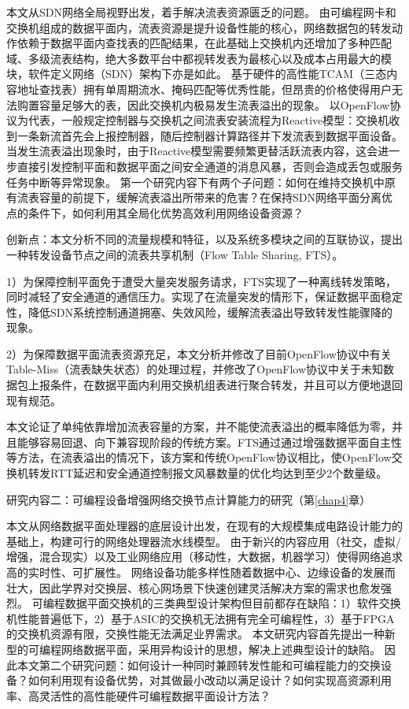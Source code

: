 {\hei 本文从SDN网络全局视野出发，着手解决流表资源匮乏的问题。}
由可编程网卡和交换机组成的数据平面内，流表资源是提升设备性能的核心，网络数据包的转发动作依赖于数据平面内查找表的匹配结果，在此基础上交换机内还增加了多种匹配域、多级流表结构，绝大多数平台中都视转发表为最核心以及成本占用最大的模块，软件定义网络（SDN）架构下亦是如此。
基于硬件的高性能TCAM（三态内容地址查找表）拥有单周期流水、掩码匹配等优秀性能，但昂贵的价格使得用户无法购置容量足够大的表，因此交换机内极易发生流表溢出的现象。
以OpenFlow协议为代表，一般规定控制器与交换机之间流表安装流程为Reactive模型：交换机收到一条新流首先会上报控制器，随后控制器计算路径并下发流表到数据平面设备。
当发生流表溢出现象时，由于Reactive模型需要频繁更替活跃流表内容，这会进一步直接引发控制平面和数据平面之间安全通道的消息风暴，否则会造成丢包或服务任务中断等异常现象。
第一个研究内容下有两个子问题：如何在维持交换机中原有流表容量的前提下，缓解流表溢出所带来的危害？在保持SDN网络平面分离优点的条件下，如何利用其全局化优势高效利用网络设备资源？


{\hei 创新点：}本文分析不同的流量规模和特征，以及系统多模块之间的互联协议，提出一种转发设备节点之间的流表共享机制（Flow Table Sharing, FTS）。

1）为保障控制平面免于遭受大量突发服务请求，FTS实现了一种离线转发策略，同时减轻了安全通道的通信压力。实现了在流量突发的情形下，保证数据平面稳定性，降低SDN系统控制通道拥塞、失效风险，缓解流表溢出导致转发性能骤降的现象。

2）为保障数据平面流表资源充足，本文分析并修改了目前OpenFlow协议中有关Table-Miss（流表缺失状态）的处理过程，并修改了OpenFlow协议中关于未知数据包上报条件，在数据平面内利用交换机组表进行聚合转发，并且可以方便地退回现有规范。

本文论证了单纯依靠增加流表容量的方案，并不能使流表溢出的概率降低为零，并且能够容易回退、向下兼容现阶段的传统方案。FTS通过通过增强数据平面自主性等方法，在流表溢出的情况下，该方案和传统OpenFlow协议相比，使OpenFlow交换机转发RTT延迟和安全通道控制报文风暴数量的优化均达到至少2个数量级。



{\hei 研究内容二：可编程设备增强网络交换节点计算能力的研究（第\ref{chap4}章）}

{\hei 本文从网络数据平面处理器的底层设计出发，在现有的大规模集成电路设计能力的基础上，构建可行的网络处理器流水线模型。}
由于新兴的内容应用（社交，虚拟/增强，混合现实）以及工业网络应用（移动性，大数据，机器学习）使得网络追求高的实时性、可扩展性。
网络设备功能多样性随着数据中心、边缘设备的发展而壮大，因此学界对交换层、核心网场景下快速创建灵活解决方案的需求也愈发强烈。
可编程数据平面交换机的三类典型设计架构但目前都存在缺陷：1）软件交换机性能普遍低下，2）基于ASIC的交换机无法拥有完全可编程性，3）基于FPGA的交换机资源有限，交换性能无法满足业界需求。
本文研究内容首先提出一种新型的可编程网络数据平面，采用异构设计的思想，解决上述典型设计的缺陷。
因此本文第二个研究问题：如何设计一种同时兼顾转发性能和可编程能力的交换设备？如何利用现有设备优势，对其做最小改动以满足设计？如何实现高资源利用率、高灵活性的高性能硬件可编程数据平面设计方法？

